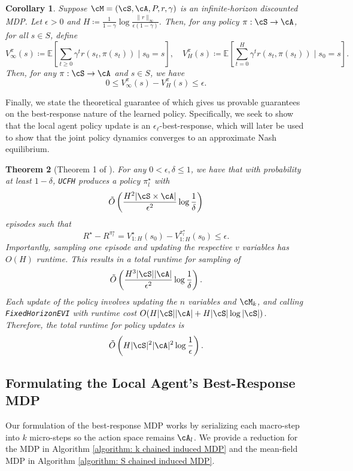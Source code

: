 \documentclass{article}
\theoremstyle{plain}
\newtheorem{theorem}{Theorem}[section]
\newtheorem{corollary}[theorem]{Corollary}
\theoremstyle{definition}
\def\E{\mathbb{E}}
\begin{document}
\begin{corollary}
    Suppose $\cM =(\cS, \cA, P, r, \gamma)$ is an infinite-horizon discounted MDP. Let $\epsilon>0$ and $H\coloneqq \frac{1}{1-\gamma}\log \frac{\|r\|_\infty}{\epsilon(1-\gamma)}$. Then, for any policy $\pi:\cS\to\cA$, for all $s\in S$, define
    \[V_\infty^\pi(s)\coloneqq \E\left[\sum_{t\geq 0}\gamma^t r(s_t, \pi(s_t))\mid s_0=s\right],\quad V_H^\pi(s)\coloneqq \E\left[\sum_{t=0}^H\gamma^t r(s_t, \pi(s_t))\mid s_0=s\right].\]
Then, for any $\pi:\cS\to\cA$ and $s\in S$, we have
\[0\leq V_\infty^\pi(s) - V_H^\pi(s) \leq \epsilon.\]
\end{corollary}
 
Finally, we state the theoretical guarantee of \citet{dann2015sample} which gives us provable guarantees on the best-response nature of the learned policy. Specifically, we seek to show that the local agent policy update is an $\epsilon_\ell$-best-response, which will later be used to show that the joint policy dynamics converges to an approximate Nash equilibrium.


\begin{theorem}
    [Theorem 1 of \citet{dann2015sample}] 
    \label{brunskill sample bound} For any $0 < \epsilon, \delta \leq 1$, we have that with  probability at least $1-\delta$, \texttt{UCFH} produces a policy $\pi_l^\star$ with \[\tilde{O}\left(\frac{H^2 |\cS\times\cA|}{\epsilon^2} \log \frac1\delta\right)\] episodes such that \[R^\star - R^{\pi_l^\star} = V_{1:H}^\star(s_0) - V_{1:H}^{\pi_l^\star}(s_0) \leq \epsilon.\] Importantly, sampling one episode and updating the respective $v$ variables has $O(H)$ runtime. This results in a total runtime for sampling of \[\tilde{O}\left(\frac{H^3 |\cS||\cA|}{\epsilon^2} \log \frac{1}{\delta}\right).\] Each update of the policy involves updating the $n$ variables and $\cM_k$, and calling \emph{\texttt{FixedHorizonEVI}} with runtime cost $O(H|\cS||\cA| + H|\cS|\log |\cS|)$. Therefore, the total runtime for policy updates is \begin{align*}\tilde{O}\left(H|\cS|^2 |\cA|^2 \log \frac1\epsilon\right).
    \end{align*}
\end{theorem}

\subsection{Formulating the Local Agent's Best-Response MDP} 

Our formulation of the best-response MDP works by serializing each macro-step into $k$ micro-steps so the action space remains 
$\cA_l$. We provide a reduction for the MDP in Algorithm \ref{algorithm: k chained induced MDP} and the mean-field MDP in Algorithm \ref{algorithm: S chained induced MDP}.
\end{document}
